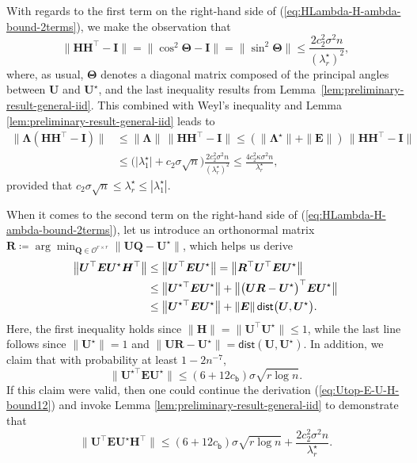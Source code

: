 With regards to the first term on the right-hand side of (\ref{eq:HLambda-H-ambda-bound-2terms}), we make the observation that
%
\[
\|\bm{H}\bm{H}^{\top}-\bm{I}\|=\|\cos^{2}\bm{\Theta}-\bm{I}\|=\|\sin^{2}\bm{\Theta}\|\leq\frac{2c_{2}^2\sigma^{2}n}{(\lambda_{r}^{\star})^{2}},
\]
%
where, as usual, $\bm{\Theta}$ denotes a diagonal matrix composed
of the principal angles between $\bm{U}$ and $\bm{U}^{\star}$, and the last inequality results from Lemma~\ref{lem:preliminary-result-general-iid}. This
combined with Weyl's inequality and Lemma \ref{lem:preliminary-result-general-iid} leads to
%
\begin{align}
\|\bm{\Lambda}(\bm{H}\bm{H}^{\top}-\bm{I})\| & \leq\|\bm{\Lambda}\|\,\|\bm{H}\bm{H}^{\top}-\bm{I}\|\leq(\|\bm{\Lambda}^{\star}\|+\|\bm{E}\|)\,\|\bm{H}\bm{H}^{\top}-\bm{I}\|\nonumber \\
 & \leq\big(\big|\lambda_{1}^{\star}\big|+c_{2}\sigma\sqrt{n}\big)\frac{2c_{2}^2\sigma^{2}n}{(\lambda_{r}^{\star})^{2}}\leq\frac{4c_{2}^2\kappa\sigma^{2}n}{\lambda_{r}^{\star}},
\label{eq:Lambda-HHT-I-bound}
\end{align}
%
provided that $c_{2}\sigma\sqrt{n}\leq\lambda_{r}^{\star}\leq|\lambda_{1}^{\star}|$.



When it comes to the second term on the right-hand side of (\ref{eq:HLambda-H-ambda-bound-2terms}),
let us introduce an orthonormal matrix $\bm{R}\coloneqq\arg\min_{\bm{Q}\in\mathcal{O}^{r\times r}}\|\bm{U}\bm{Q}-\bm{U}^{\star}\|$, which helps us derive
%
\begin{align}
\big\|\bm{U}^{\top}\bm{E}\bm{U}^{\star}\bm{H}^{\top}\big\| & \leq\big\|\bm{U}^{\top}\bm{E}\bm{U}^{\star}\big\|=\big\|\bm{R}^{\top}\bm{U}^{\top}\bm{E}\bm{U}^{\star}\big\| \notag\\
 & \leq\big\|\bm{U}^{\star\top}\bm{E}\bm{U}^{\star}\big\|+\big\|\big(\bm{U}\bm{R}-\bm{U}^{\star}\big)^{\top}\bm{E}\bm{U}^{\star}\big\| \notag\\
	& \leq\big\|\bm{U}^{\star\top}\bm{E}\bm{U}^{\star}\big\|+\|\bm{E}\|\,\mathsf{dist}\big(\bm{U},\bm{U}^{\star}\big). \label{eq:Utop-E-U-H-bound12}
\end{align}
%
Here, the first inequality holds since $\|\bm{H}\|=\|\bm{U}^{\top}\bm{U}^{\star}\|\leq1$,
while the last line follows since $\|\bm{U}^{\star}\|=1$ and $\|\bm{U}\bm{R}-\bm{U}^{\star}\|=\mathsf{dist}(\bm{U},\bm{U}^{\star})$.
In addition, we claim that with probability at least $1-2n^{-7}$,
%
\begin{equation}
\|\bm{U}^{\star\top}\bm{E}\bm{U}^{\star}\|\leq(6+12 c_{\mathsf{b}})\sigma\sqrt{r\log n}.
	\label{eq:claim-Utop-E-Ustar-spectral-norm}
\end{equation}
%
If this claim were valid, then one could continue the derivation (\ref{eq:Utop-E-U-H-bound12}) and invoke Lemma \ref{lem:preliminary-result-general-iid} to demonstrate that
%
\begin{equation}
\big\|\bm{U}^{\top}\bm{E}\bm{U}^{\star}\bm{H}^{\top}\big\|\leq(6+12 c_{\mathsf{b}})\sigma\sqrt{r\log n}+\frac{2c_{2}^{2}\sigma^{2}n}{\lambda_{r}^{\star}}.
	\label{eq:UB-UEUHtop-UB1}
\end{equation}
%

